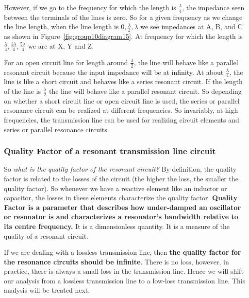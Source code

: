 However, if we go to the frequency for which the length is $ \frac{\lambda}{4} $, the impedance seen between the terminals of the lines is zero. So for a given frequency as we change the line length, when the line
length is $0, \frac{\lambda}{2}, \lambda $ we see impedances at A, B, and C as shown in Figure~\ref{fig:group10diagram15}. At frequency for which the length is $ \frac{\lambda}{4}, \frac{3\lambda}{4}, \frac{5\lambda}{4}$ we are at X, Y and Z.

For an open circuit line for length around $\frac{\lambda}{2} $, the line will behave like a parallel resonant circuit because the input impedance will be at infinity. At about $ \frac{\lambda}{4} $, the line is like a short circuit and behaves like a series resonant circuit. If the length of the line is $ \frac{\lambda}{2} $ the line will behave like a parallel resonant circuit.
So depending on whether a short circuit line or open circuit line is used, the series or parallel resonance circuit can be realized at different frequencies. So invariably, at high frequencies, the transmission line can be used for realizing circuit elements and series or parallel resonance circuits.

\subsubsection{Quality Factor of a resonant transmission line circuit}
So \emph{what is the quality factor of the resonant circuit?} By definition, the quality factor is related to the losses of the circuit (the higher the loss, the smaller the quality factor). So whenever we have a reactive element like an inductor or capacitor, the losses in these elements characterize the quality factor. \textbf{Quality Factor is a parameter that describes how under-damped an oscillator or resonator is and characterizes a resonator's bandwidth relative to its centre frequency.} It is a dimensionless quantity. It is a measure of the quality of a resonant circuit. 

If we are dealing with a lossless transmission line, then \textbf{the quality factor for the resonance circuits should be infinite}. There is no loss, however, in practice, there is always a small loss in the transmission line. Hence we will shift our analysis from a lossless transmission line to a low-loss transmission line. This analysis will be treated next.

